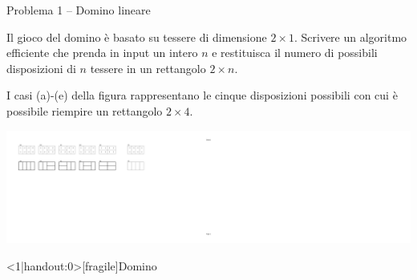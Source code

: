 \begin{frame}{Problema 1 -- Domino lineare}

\vspace{-9pt}
\begin{myboxtitle}[Definizione]
Il gioco del domino è basato su tessere di dimensione $2 \times 1$. Scrivere
un algoritmo efficiente che prenda in input un intero $n$ e restituisca il numero di possibili disposizioni di $n$ tessere in un rettangolo $2 \times n$.
\end{myboxtitle}

\bigskip
{}

I casi (a)-(e) della figura rappresentano le cinque disposizioni possibili con cui è possibile riempire un rettangolo $2 \times 4$. 

\begin{center}
\includegraphics[width=1.0\textwidth]{domino.pdf}
\end{center}

\end{frame}


\begin{frame}<1|handout:0>[fragile]{Domino}

\vspace{-9pt}

\end{frame}

